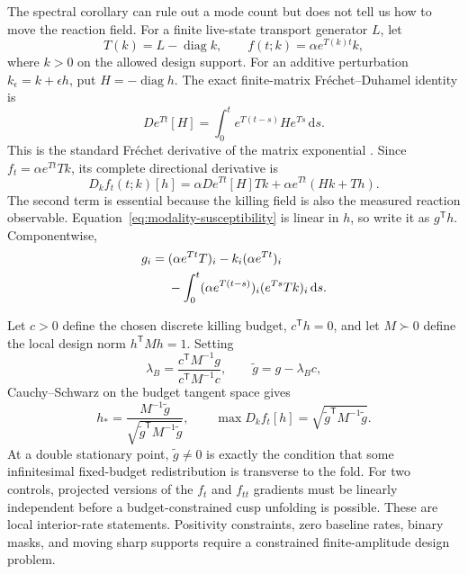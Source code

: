 \documentclass[aps,pre,reprint,amsmath,amssymb,longbibliography,floatfix]{revtex4-2}
\newcommand{\dd}{\mathrm d}
\begin{document}
The spectral corollary can rule out a mode count but does not tell us how to
move the reaction field. For a finite live-state transport generator \(L\),
let
\begin{equation}
T(k)=L-\operatorname{diag}k,
\qquad
f(t;k)=\alpha e^{T(k)t}k,
\label{eq:killing-design-model}
\end{equation}
where \(k>0\) on the allowed design support. For an additive perturbation
\(k_\epsilon=k+\epsilon h\), put \(H=-\operatorname{diag}h\). The exact
finite-matrix Fr\'echet--Duhamel identity is
\begin{equation}
D e^{Tt}[H]=\int_0^t e^{T(t-s)}H e^{Ts}\,\dd s.
\label{eq:design-duhamel}
\end{equation}
This is the standard Fr\'echet derivative of the matrix exponential
\cite{alMohyHigham2009frechet}.
Since \(f_t=\alpha e^{Tt}Tk\), its complete directional derivative is
\begin{equation}
D_k f_t(t;k)[h]
=\alpha D e^{Tt}[H]Tk
 +\alpha e^{Tt}(Hk+Th).
\label{eq:modality-susceptibility}
\end{equation}
The second term is essential because the killing field is also the measured
reaction observable. Equation~\eqref{eq:modality-susceptibility} is linear in
\(h\), so write it as \(g^\mathsf Th\). Componentwise,
\begin{align}
g_i={}&(\alpha e^{Tt}T)_i-k_i(\alpha e^{Tt})_i\notag\\
&-\int_0^t(\alpha e^{T(t-s)})_i(e^{Ts}Tk)_i\,\dd s.
\label{eq:modality-gradient}
\end{align}

Let \(c>0\) define the chosen discrete killing budget, \(c^\mathsf Th=0\),
and let \(M\succ0\) define the local design norm \(h^\mathsf TMh=1\). Setting
\begin{equation}
\lambda_B=\frac{c^\mathsf TM^{-1}g}{c^\mathsf TM^{-1}c},
\qquad \widetilde g=g-\lambda_Bc,
\label{eq:budget-projection}
\end{equation}
Cauchy--Schwarz on the budget tangent space gives
\begin{equation}
h_*=\frac{M^{-1}\widetilde g}
{\sqrt{\widetilde g^\mathsf TM^{-1}\widetilde g}},
\qquad
\max D_kf_t[h]=\sqrt{\widetilde g^\mathsf TM^{-1}\widetilde g}.
\label{eq:optimal-redistribution}
\end{equation}
At a double stationary point, \(\widetilde g\ne0\) is exactly the condition
that some infinitesimal fixed-budget redistribution is transverse to the fold.
For two controls, projected versions of the \(f_t\) and \(f_{tt}\) gradients
must be linearly independent before a budget-constrained cusp unfolding is
possible. These are local interior-rate statements. Positivity constraints,
zero baseline rates, binary masks, and moving sharp supports require a
constrained finite-amplitude design problem.
\end{document}
